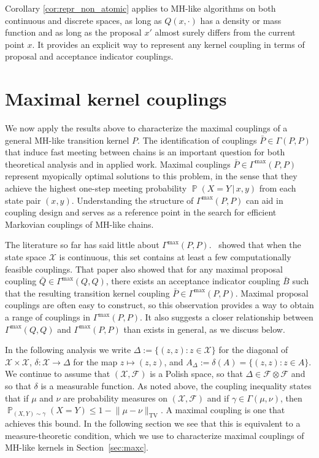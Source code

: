 \documentclass[aihp]{imsart}
\theoremstyle{plain}
\theoremstyle{remark}
\theoremstyle{definition} \newtheorem{example}{Example}
\renewcommand{\P}{\operatorname{\mathbb{P}}}
\newcommand{\scrF}{\mathscr{F}}
\newcommand{\calX}{\mathcal{X}}
\newcommand{\g}{\, | \,}
\newcommand{\TV}{\mathrm{TV}}
\newcommand{\calXp}{\calX \times \calX}
\newcommand{\scrFp}{\scrF \otimes \scrF}
\newcommand{\bp}{\bar P}
\newcommand{\bq}{\bar Q}
\newcommand{\bb}{\bar B}
\newcommand{\XY}{(X,Y)}
\newcommand{\Gmax}{\Gamma^\mathrm{max}}
\begin{document}
Corollary \ref{cor:repr_non_atomic} applies to MH-like algorithms on both continuous and discrete
spaces, as long as $Q(x,\cdot)$ has a density or mass function and as long as the proposal $x'$
almost surely differs from the current point $x$. It provides an explicit way to represent any
kernel coupling in terms of proposal and acceptance indicator couplings.


\section{Maximal kernel couplings}
\label{sec:maximal}

We now apply the results above to characterize the maximal couplings of a general MH-like transition
kernel $P$. The identification of couplings $\bp \in \Gamma(P,P)$ that induce fast meeting between
chains is an important question for both theoretical analysis and in applied work. Maximal couplings
$\bp \in \Gmax(P,P)$ represent myopically optimal solutions to this problem, in the sense that they
achieve the highest one-step meeting probability $\P(X=Y \g x, y)$ from each state pair $(x,y)$.
Understanding the structure of $\Gmax(P,P)$ can aid in coupling design and serves as a reference
point in the search for efficient Markovian couplings of MH-like chains.

The literature so far has said little about $\Gmax(P,P)$.~\citet{OLeary2020} showed that when the
state space $\calX$ is continuous, this set contains at least a few computationally feasible
couplings. That paper also showed that for any maximal proposal coupling $\bq \in \Gmax(Q,Q)$, there
exists an acceptance indicator coupling $\bb$ such that the resulting transition kernel coupling
$\bp \in \Gmax(P,P)$. Maximal proposal couplings are often easy to construct, so this observation
provides a way to obtain a range of couplings in $\Gmax(P,P)$. It also suggests a closer
relationship between $\Gmax(Q,Q)$ and $\Gmax(P,P)$ than exists in general, as we discuss below.

In the following analysis we write $\Delta := \{(z,z) : z \in \calX\}$ for the diagonal of $\calXp$,
$\delta : \calX \to \Delta$ for the map ${z \mapsto (z,z)}$, and $A_\Delta := \delta(A) = \{(z,z) :
z \in A\}$. We continue to assume that $(\calX, \scrF)$ is a Polish space, so that $\Delta \in
\scrFp$ and so that $\delta$ is a measurable function. As noted above, the coupling inequality states that
if $\mu$ and $\nu$ are probability measures on $(\calX, \scrF)$ and if ${\gamma \in \Gamma(\mu,
	\nu)}$, then $\P_{\XY \sim \gamma}(X = Y) \leq 1 - \lVert \mu - \nu \rVert_\TV$. A maximal coupling
is one that achieves this bound. In the following section we see that this is equivalent to a
measure-theoretic condition, which we use to characterize maximal couplings of MH-like kernels in
Section~\ref{sec:maxc}.
\end{document}
